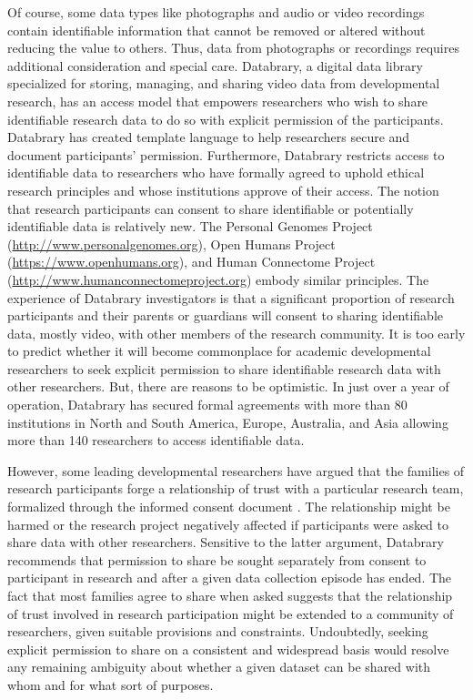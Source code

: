 \documentclass[letterpaper,man,apacite,natbib]{apa6}
\begin{document}
Of course, some data types like photographs and audio or video recordings contain identifiable information that cannot be removed or altered without reducing the value to others.
Thus, data from photographs or recordings requires additional consideration and special care.
Databrary, a digital data library specialized for storing, managing, and sharing video data from developmental research, has an access model that empowers researchers who wish to share identifiable research data to do so with explicit permission of the participants.
Databrary has created template language to help researchers secure and document participants' permission.
Furthermore, Databrary restricts access to identifiable data to researchers who have formally agreed to uphold ethical research principles and whose institutions approve of their access.
The notion that research participants can consent to share identifiable or potentially identifiable data is relatively new.
The Personal Genomes Project (\url{http://www.personalgenomes.org}), Open Humans Project (\url{https://www.openhumans.org}), and Human Connectome Project (\url{http://www.humanconnectomeproject.org}) embody similar principles.
The experience of Databrary investigators is that a significant proportion of research participants and their parents or guardians will consent to sharing identifiable data, mostly video, with other members of the research community.
It is too early to predict whether it will become commonplace for academic developmental researchers to seek explicit permission to share identifiable research data with other researchers.
But, there are reasons to be optimistic.
In just over a year of operation, Databrary has secured formal agreements with more than 80 institutions in North and South America, Europe, Australia, and Asia allowing more than 140 researchers to access identifiable data.

However, some leading developmental researchers have argued that the families of research participants forge a relationship of trust with a particular research team, formalized through the informed consent document \cite{eisenberg_thoughts_2015}.
The relationship might be harmed or the research project negatively affected if participants were asked to share data with other researchers.
Sensitive to the latter argument, Databrary recommends that permission to share be sought separately from consent to participant in research and after a given data collection episode has ended.
The fact that most families agree to share when asked suggests that the relationship of trust involved in research participation might be extended to a community of researchers, given suitable provisions and constraints.
Undoubtedly, seeking explicit permission to share on a consistent and widespread basis would resolve any remaining ambiguity about whether a given dataset can be shared with whom and for what sort of purposes.
\end{document}
